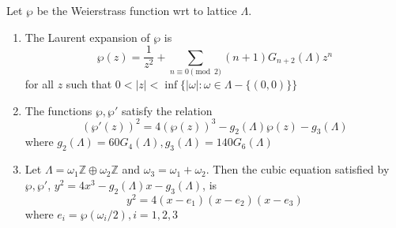 \documentclass[oneside, 12pt]{scrbook}
\newcommand{\ZZ}{\mathbb Z}
\theoremstyle{theorem}
\begin{document}
\begin{proposition}
Let $\wp$ be the Weierstrass function wrt to lattice $\Lambda$. 
\begin{enumerate}
\item The Laurent expansion of $\wp$ is 
\begin{equation}
\wp(z) = \frac{1}{z^2} + \sum_{n\equiv 0 \pmod{2}} (n+1)G_{n+2}(\Lambda)z^n
\end{equation}
for all $z$ such that $0 < |z| < \inf \{|\omega|: \omega \in \Lambda - \{(0,0)\}\}$
\item The functions $\wp, \wp'$ satisfy the relation 
\begin{equation}
(\wp'(z))^2 = 4(\wp(z))^3 - g_{2}(\Lambda)\wp(z) - g_{3}(\Lambda)
\end{equation}
where $g_{2}(\Lambda) = 60G_{4}(\Lambda), g_{3}(\Lambda) = 140 G_{6} (\Lambda)$
\item Let $\Lambda =\omega_{1}\ZZ \oplus \omega_{2}\ZZ$ and $\omega_{3} =\omega_{1} + \omega_{2}$. Then the cubic equation satisfied by $\wp , \wp '$, $y^2 = 4x^3 -g_{2}(\Lambda)x - g_{3}(\Lambda)$, is $$y^2 = 4(x-e_{1})(x-e_{2})(x-e_{3})$$ where $e_{i} = \wp (\omega_{i}/2), i=1,2,3$
\end{enumerate}
\end{proposition}
\end{document}
